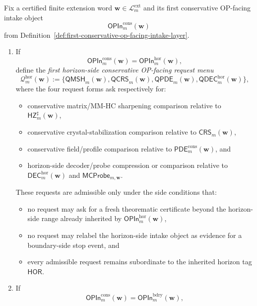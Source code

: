 \begin{definition}
\label{def:first-conservative-op-facing-work-request-contract}
Fix a certified finite extension word \(\mathbf w\in\mathcal L^{\mathrm{ext}}_{m}\) and its first conservative OP-facing intake object
\[
  \mathsf{OPIn}^{\mathrm{cons}}_{m}(\mathbf w)
\]
from Definition~\ref{def:first-conservative-op-facing-intake-layer}.
\begin{enumerate}[label=(\roman*)]
  \item If
  \[
    \mathsf{OPIn}^{\mathrm{cons}}_{m}(\mathbf w)=\mathsf{OPIn}^{\mathrm{hor}}_{m}(\mathbf w),
  \]
  define the \emph{first horizon-side conservative OP-facing request menu}
  \[
    \mathcal Q^{\mathrm{hor}}_{m}(\mathbf w)
    :=
    \{\mathsf{QMSH}_{m}(\mathbf w),\mathsf{QCRS}_{m}(\mathbf w),\mathsf{QPDE}_{m}(\mathbf w),\mathsf{QDEC}^{\mathrm{hor}}_{m}(\mathbf w)\},
  \]
  where the four request forms ask respectively for:
  \begin{itemize}[leftmargin=2em]
    \item conservative matrix/MM-HC sharpening comparison relative to \(\mathsf{HZ}^{\sharp}_{m}(\mathbf w)\),
    \item conservative crystal-stabilization comparison relative to \(\mathsf{CRS}_{m}(\mathbf w)\),
    \item conservative field/profile comparison relative to \(\mathsf{PDE}^{\mathrm{cons}}_{m}(\mathbf w)\), and
    \item horizon-side decoder/probe compression or comparison relative to \(\mathsf{DEC}^{\mathrm{hor}}_{m}(\mathbf w)\) and \(\mathsf{MCProbe}_{m,\mathbf w}\).
  \end{itemize}
  These requests are admissible only under the side conditions that:
  \begin{itemize}[leftmargin=2em]
    \item no request may ask for a fresh theorematic certificate beyond the horizon-side range already inherited by \(\mathsf{OPIn}^{\mathrm{hor}}_{m}(\mathbf w)\),
    \item no request may relabel the horizon-side intake object as evidence for a boundary-side stop event, and
    \item every admissible request remains subordinate to the inherited horizon tag \(\mathsf{HOR}\).
  \end{itemize}
  \item If
  \[
    \mathsf{OPIn}^{\mathrm{cons}}_{m}(\mathbf w)=\mathsf{OPIn}^{\mathrm{bdry}}_{m}(\mathbf w),
\]
\end{enumerate}
\end{definition}
